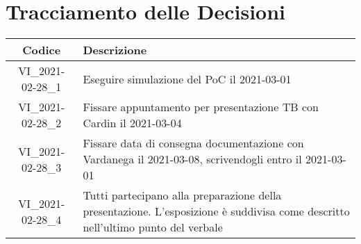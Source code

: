 \section*{Tracciamento delle Decisioni}

\begin{center}
	\begin{longtable}{|c|p{13cm}|}
	\hline
	\rowcolor{lighter-grayer}
	\textbf{Codice} & \textbf{Descrizione} \\
	\hline
	\endfirsthead

	\hline
	VI\_2021-02-28\_1 & Eseguire simulazione del PoC il 2021-03-01\\
	VI\_2021-02-28\_2 & Fissare appuntamento per presentazione TB con Cardin il 2021-03-04  \\
	VI\_2021-02-28\_3 & Fissare data di consegna documentazione con Vardanega il 2021-03-08, scrivendogli entro il 2021-03-01 \\
	VI\_2021-02-28\_4 & Tutti partecipano alla preparazione della presentazione. L'esposizione è suddivisa come descritto nell'ultimo punto del verbale \\
	\hline

	\end{longtable}
\end{center}